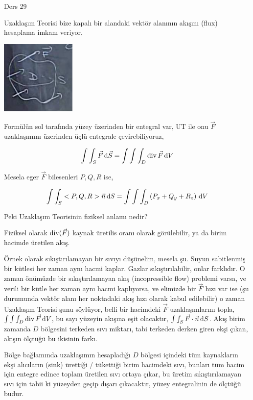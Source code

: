 \documentclass[12pt,fleqn]{article}\usepackage{../../common}
\begin{document}
Ders 29

Uzaklaşım Teorisi bize kapalı bir alandaki vektör alanının akışını (flux)
hesaplama imkanı veriyor, 

\includegraphics[width=10em]{calc_multi_29_02.jpg}

Formülün sol tarafında yüzey üzerinden bir entegral var, UT ile onu $\vec{F}$
uzaklaşımını üzerinden üçlü entegrale çevirebiliyoruz,

$$
\int \int_S \vec{F} \,\mathrm{d} \vec{S} =
\int \int \int_D \operatorname{div} \vec{F} \,\mathrm{d} V
$$

Mesela eger $\vec{F}$ bilesenleri $P,Q,R$ ise,

$$
\int \int_S < P,Q,R > \vec{n} \,\mathrm{d} S = \int \int \int_D \left( P_x + Q_y + R_z \right) \,\mathrm{d} V
$$

Peki Uzaklaşım Teorisinin fiziksel anlamı nedir?

Fiziksel olarak $\operatorname{div}(\vec{F})$ kaynak üretilis oranı olarak görülebilir,
ya da birim hacimde üretilen akış.

Örnek olarak sıkıştırılamayan bir sıvıyı düşünelim, mesela şu. Suyun sabitlenmiş
bir kütlesi her zaman aynı hacmi kaplar. Gazlar sıkıştırılabilir, onlar
farklıdır.  O zaman önümüzde bir sıkıştırılamayan akış (incopressible flow)
problemi varsa, ve verili bir kütle her zaman aynı hacmi kaplıyorsa, ve elimizde
bir $\vec{F}$ hızı var ise (şu durumunda vektör alanı her noktadaki akış hızı
olarak kabul edilebilir) o zaman Uzaklaşım Teorisi şunu söylüyor, belli bir
hacimdeki $\vec{F}$ uzaklaşımlarını topla, $\int \int \int_D \operatorname{div} \vec{F} \,\mathrm{d} V$, 
bu sayı yüzeyin akışına eşit olacaktır, $\int \int_S \vec{F} \cdot \vec{n} \,\mathrm{d} S$.
Akış birim zamanda $D$ bölgesini terkeden sıvı miktarı, tabi terkeden derken
giren ekşi çıkan, akışın ölçtüğü bu ikisinin farkı.

Bölge bağlamında uzaklaşımın hesapladığı $D$ bölgesi içindeki tüm kaynakların
ekşi alıcıların (sink) ürettiği / tükettiği birim hacimdeki sıvı, bunları
tüm hacim için entegre edince toplam üretilen sıvı ortaya çıkar, bu üretim
sıkıştırılamayan sıvı için tabii ki yüzeyden geçip dışarı çıkacaktır, yüzey
entegralinin de ölçtüğü budur.
\end{document}
